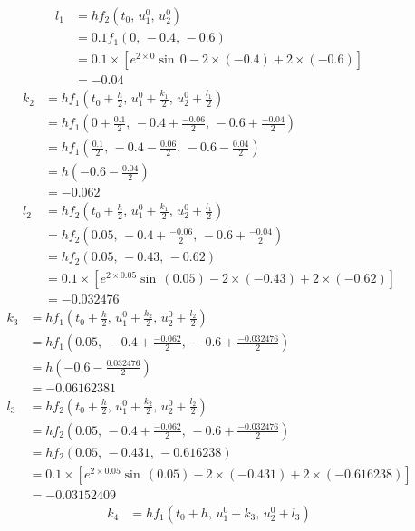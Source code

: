 \documentclass[../main-sheet.tex]{subfiles}
\begin{document}
\begin{soln}
\begin{align*}
        l_1&=hf_2(t_0,\,u_1^0,\,u_2^0)\\
        &=0.1f_1(0,\,-0.4,\,-0.6)\\
        &=0.1\times [e^{2\times 0}\sin \,0-2\times(-0.4)+2\times(-0.6)]\\
        &=-0.04
    \end{align*}
    \begin{align*}
        k_2&=hf_1\left(t_0+\frac{h}{2},\,u_1^0+\frac{k_1}{2},\,u_2^0+\frac{l_1}{2}\right)\\
        &=hf_1\left(0+\frac{0.1}{2},\,-0.4+\frac{-0.06}{2},\,-0.6+\frac{-0.04}{2}\right)\\
        &=hf_1\left(\frac{0.1}{2},\,-0.4-\frac{0.06}{2},\,-0.6-\frac{0.04}{2}\right)\\
        &=h\left(-0.6-\frac{0.04}{2}\right)\\
        &=-0.062\\
        l_2&=hf_2\left(t_0+\frac{h}{2},\,u_1^0+\frac{k_1}{2},\,u_2^0+\frac{l_1}{2}\right)\\
        &=hf_2\left(0.05,\,-0.4+\frac{-0.06}{2},\,-0.6+\frac{-0.04}{2}\right)\\
        &=hf_2\left(0.05,\,-0.43,\,-0.62\right)\\
        &=0.1\times\left[e^{2\times 0.05}\sin \,(0.05)-2\times(-0.43)+2\times(-0.62)\right]\\
        &=-0.032476
    \end{align*}
    \begin{align*}
        k_3&=hf_1\left(t_0+\frac{h}{2},\,u_1^0+\frac{k_2}{2},\,u_2^0+\frac{l_2}{2}\right)\\
        &=hf_1\left(0.05,\,-0.4+\frac{-0.062}{2},\,-0.6+\frac{-0.032476}{2}\right)\\
        &=h\left(-0.6-\frac{0.032476}{2}\right)\\
        &=-0.06162381\\
        l_3&=hf_2\left(t_0+\frac{h}{2},\,u_1^0+\frac{k_2}{2},\,u_2^0+\frac{l_2}{2}\right)\\
        &=hf_2\left(0.05,\,-0.4+\frac{-0.062}{2},\,-0.6+\frac{-0.032476}{2}\right)\\
        &=hf_2\left(0.05,\,-0.431,\,-0.616238\right)\\
        &=0.1\times\left[e^{2\times 0.05}\sin \,(0.05)-2\times(-0.431)+2\times(-0.616238)\right]\\
        &=-0.03152409
    \end{align*}
    \begin{align*}
        k_4&=hf_1\left(t_0+h,\,u_1^0+k_3,\,u_2^0+l_3\right)\\

\end{align*}
\end{soln}
\end{document}
